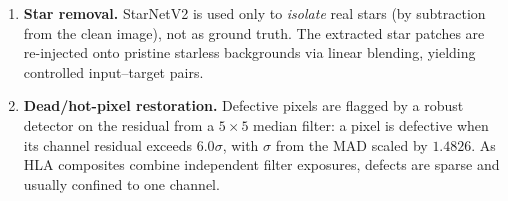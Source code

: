 \documentclass{article}
\begin{document}
\begin{enumerate}
	\item \textbf{Star removal.} StarNetV2 \cite{starnet} is used only to \emph{isolate} real stars (by subtraction from the clean image), not as ground truth. The extracted star patches are re-injected onto pristine starless backgrounds via linear blending, yielding controlled input--target pairs.
	\item \textbf{Dead/hot-pixel restoration.} Defective pixels are flagged by a robust detector on the residual from a $5\times5$ median filter: a pixel is defective when its channel residual exceeds $6.0\sigma$, with $\sigma$ from the MAD scaled by $1.4826$. As HLA composites combine independent filter exposures, defects are sparse and usually confined to one channel.

\end{enumerate}
\end{document}
